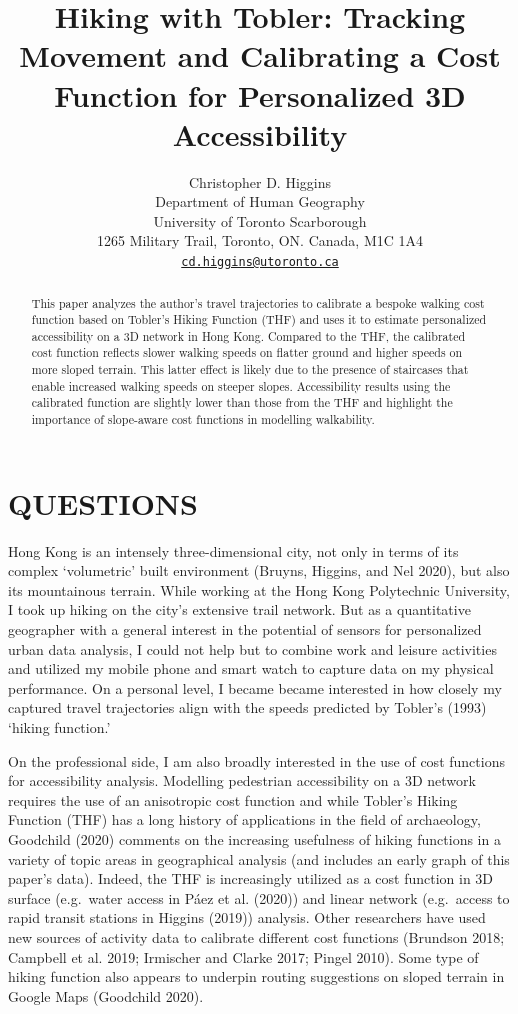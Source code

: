 \documentclass{article}
\title{Hiking with Tobler: Tracking Movement and Calibrating a Cost
Function for Personalized 3D Accessibility}
\author{
    Christopher D. Higgins
   \\
    Department of Human Geography \\
    University of Toronto Scarborough \\
  1265 Military Trail, Toronto, ON. Canada, M1C 1A4 \\
  \texttt{\href{mailto:cd.higgins@utoronto.ca}{\nolinkurl{cd.higgins@utoronto.ca}}} \\
  }
\begin{document}
\maketitle

\def\tightlist{}


\begin{abstract}
This paper analyzes the author's travel trajectories to calibrate a
bespoke walking cost function based on Tobler's Hiking Function (THF)
and uses it to estimate personalized accessibility on a 3D network in
Hong Kong. Compared to the THF, the calibrated cost function reflects
slower walking speeds on flatter ground and higher speeds on more sloped
terrain. This latter effect is likely due to the presence of staircases
that enable increased walking speeds on steeper slopes. Accessibility
results using the calibrated function are slightly lower than those from
the THF and highlight the importance of slope-aware cost functions in
modelling walkability.
\end{abstract}


\hypertarget{questions}{%
\section{QUESTIONS}\label{questions}}

Hong Kong is an intensely three-dimensional city, not only in terms of
its complex `volumetric' built environment (Bruyns, Higgins, and Nel
2020), but also its mountainous terrain. While working at the Hong Kong
Polytechnic University, I took up hiking on the city's extensive trail
network. But as a quantitative geographer with a general interest in the
potential of sensors for personalized urban data analysis, I could not
help but to combine work and leisure activities and utilized my mobile
phone and smart watch to capture data on my physical performance. On a
personal level, I became became interested in how closely my captured
travel trajectories align with the speeds predicted by Tobler's (1993)
`hiking function.'

On the professional side, I am also broadly interested in the use of
cost functions for accessibility analysis. Modelling pedestrian
accessibility on a 3D network requires the use of an anisotropic cost
function and while Tobler's Hiking Function (THF) has a long history of
applications in the field of archaeology, Goodchild (2020) comments on
the increasing usefulness of hiking functions in a variety of topic
areas in geographical analysis (and includes an early graph of this
paper's data). Indeed, the THF is increasingly utilized as a cost
function in 3D surface (e.g.~water access in Páez et al. (2020)) and
linear network (e.g.~access to rapid transit stations in Higgins (2019))
analysis. Other researchers have used new sources of activity data to
calibrate different cost functions (Brundson 2018; Campbell et al. 2019;
Irmischer and Clarke 2017; Pingel 2010). Some type of hiking function
also appears to underpin routing suggestions on sloped terrain in Google
Maps (Goodchild 2020).
\end{document}
